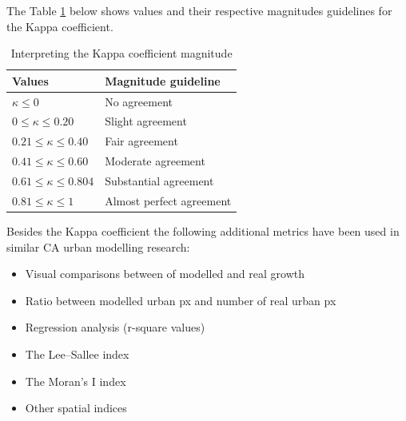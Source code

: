 The Table \ref{table:kap} below shows values and their respective magnitudes guidelines for the Kappa coefficient\cite{kappatb}.
\begin{table}[H]
\centering
\caption{Interpreting the Kappa coefficient magnitude}
\label{table:kap}
\begin{tabular}{@{}ll@{}}
\toprule
\multicolumn{1}{l}{Values} & \multicolumn{1}{l}{Magnitude guideline} \\ \midrule
$\kappa \leq 0$                & No agreement                            \\
$0 \leq \kappa \leq 0.20$                     & Slight agreement                        \\
$0.21 \leq \kappa \leq 0.40$                  & Fair agreement                          \\
$0.41 \leq \kappa \leq 0.60$                  & Moderate agreement                      \\
$0.61 \leq \kappa \leq 0.804$                  & Substantial agreement                   \\
$0.81 \leq \kappa \leq 1$                     & Almost perfect agreement                \\ \bottomrule
\end{tabular}
\end{table}
Besides the Kappa coefficient the following additional metrics have been used in similar CA urban modelling research:
\begin{itemize}
\item Visual comparisons between of modelled and real growth\cite{om1,om6,m8}
\item Ratio between modelled urban px and number of real urban px\cite{om2,om5}
\item Regression analysis (r-square values)\cite{om3}
\item The Lee–Sallee index\cite{om4,m1}
\item The Moran's I index\cite{om6}
\item Other spatial indices
\end{itemize}

